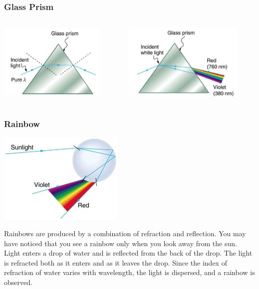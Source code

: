 \documentclass{beamer}
\begin{document}
\begin{frame}\frametitle{Glass Prism}
\begin{columns}
\begin{column}{5.5cm}
\begin{center}
\includegraphics[height=3.6cm]{fig/gpideal.jpg}
\end{center}
\end{column}
\begin{column}{5.5cm}
\begin{center}
\includegraphics[height=3.7cm]{fig/gpreal.jpg}
\end{center}
\end{column}
\end{columns}
\end{frame}

\begin{frame}\frametitle{Rainbow}
\begin{center}
\includegraphics[width=6cm]{fig/rainbow2.jpg}
\end{center}
Rainbows are produced by a combination of refraction and reflection. You may have noticed that you see a rainbow only when you look away from the sun. Light enters a drop of water and is reflected from the back of the drop. The light is refracted both as it enters and as it leaves the drop. Since the index of refraction of water varies with wavelength, the light is dispersed, and a rainbow is observed.
\end{frame}
\end{document}
